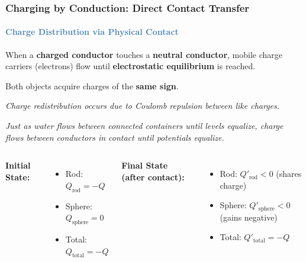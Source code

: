 \begin{frame}
\frametitle{\textsf{\textbf{Charging by Conduction:} Direct Contact Transfer}}
\framesubtitle{\textcolor{steelblue}{Charge Distribution via Physical Contact}}

\vspace{-0.05cm}

\begin{keybox}
\vspace{0.1cm}
When a \textbf{charged conductor} touches a \textbf{neutral conductor}, mobile charge carriers (electrons) flow until \textbf{electrostatic equilibrium} is reached.
\begin{center}
Both objects acquire charges of the \textbf{same sign}.
\end{center}
\textit{Charge redistribution occurs due to Coulomb repulsion between like charges.}
\end{keybox}

\vspace{0.3cm}

\begin{examplebox}
\vspace{0.1cm}
\textit{Just as water flows between connected containers until levels equalize, charge flows between conductors in contact until potentials equalize.}
\end{examplebox}

\vspace{0.3cm}

\begin{formulabox}
\vspace{0.15cm}
\begin{columns}[T]
    \textbf{Initial State:}
    \begin{itemize}
        \item Rod: $Q_{\text{rod}} = -Q$
        \item Sphere: $Q_{\text{sphere}} = 0$
        \item Total: $Q_{\text{total}} = -Q$
    \end{itemize}
    
    \textbf{Final State (after contact):}
    \begin{itemize}
        \item Rod: $Q'_{\text{rod}} < 0$ (shares charge)
        \item Sphere: $Q'_{\text{sphere}} < 0$ (gains negative)
        \item Total: $Q'_{\text{total}} = -Q$ 
    \end{itemize}
\end{columns}


\end{formulabox}
\end{frame}
